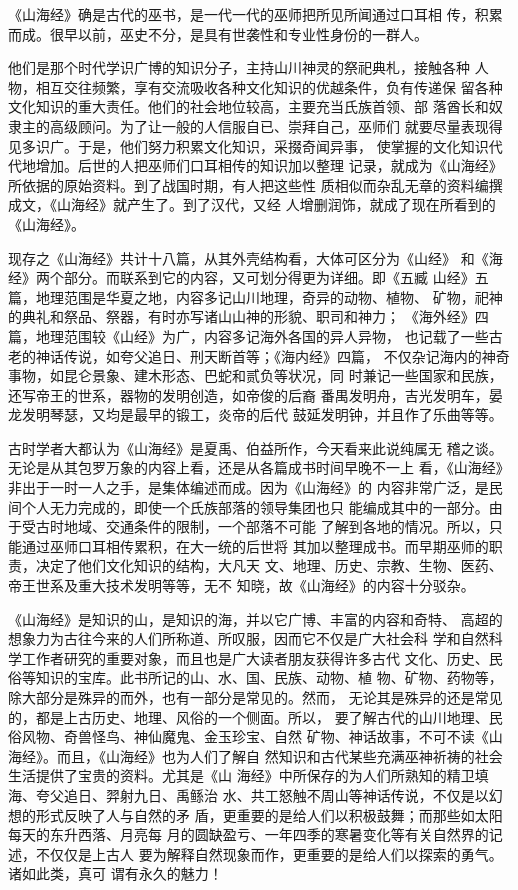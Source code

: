 \documentclass[a4paper,12pt,UTF8,twoside]{ctexbook}
\begin{document}
《山海经》确是古代的巫书，是一代一代的巫师把所见所闻通过口耳相 传，积累而成。很早以前，巫史不分，是具有世袭性和专业性身份的一群人。

他们是那个时代学识广博的知识分子，主持山川神灵的祭祀典札，接触各种 人物，相互交往频繁，享有交流吸收各种文化知识的优越条件，负有传递保 留各种文化知识的重大责任。他们的社会地位较高，主要充当氏族首领、部 落酋长和奴隶主的高级顾问。为了让一般的人信服自已、崇拜自己，巫师们 就要尽量表现得见多识广。于是，他们努力积累文化知识，采掇奇闻异事， 使掌握的文化知识代代地增加。后世的人把巫师们口耳相传的知识加以整理 记录，就成为《山海经》所依据的原始资料。到了战国时期，有人把这些性 质相似而杂乱无章的资料编撰成文，《山海经》就产生了。到了汉代，又经 人增删润饰，就成了现在所看到的《山海经》。

现存之《山海经》共计十八篇，从其外壳结构看，大体可区分为《山经》 和《海经》两个部分。而联系到它的内容，又可划分得更为详细。即《五臧 山经》五篇，地理范围是华夏之地，内容多记山川地理，奇异的动物、植物、 矿物，祀神的典礼和祭品、祭器，有时亦写诸山山神的形貌、职司和神力； 《海外经》四篇，地理范围较《山经》为广，内容多记海外各国的异人异物， 也记载了一些古老的神话传说，如夸父追日、刑天断首等；《海内经》四篇， 不仅杂记海内的神奇事物，如昆仑景象、建木形态、巴蛇和贰负等状况，同 时兼记一些国家和民族，还写帝王的世系，器物的发明创造，如帝俊的后裔 番禺发明舟，吉光发明车，晏龙发明琴瑟，又均是最早的锻工，炎帝的后代 鼓延发明钟，并且作了乐曲等等。

古时学者大都认为《山海经》是夏禹、伯益所作，今天看来此说纯属无 稽之谈。无论是从其包罗万象的内容上看，还是从各篇成书时间早晚不一上 看，《山海经》非出于一时一人之手，是集体编述而成。因为《山海经》的 内容非常广泛，是民间个人无力完成的，即使一个氏族部落的领导集团也只 能编成其中的一部分。由于受古时地域、交通条件的限制，一个部落不可能 了解到各地的情况。所以，只能通过巫师口耳相传累积，在大一统的后世将 其加以整理成书。而早期巫师的职责，决定了他们文化知识的结构，大凡天 文、地理、历史、宗教、生物、医药、帝王世系及重大技术发明等等，无不 知晓，故《山海经》的内容十分驳杂。

《山海经》是知识的山，是知识的海，并以它广博、丰富的内容和奇特、 高超的想象力为古往今来的人们所称道、所叹服，因而它不仅是广大社会科 学和自然科学工作者研究的重要对象，而且也是广大读者朋友获得许多古代 文化、历史、民俗等知识的宝库。此书所记的山、水、国、民族、动物、植 物、矿物、药物等，除大部分是殊异的而外，也有一部分是常见的。然而， 无论其是殊异的还是常见的，都是上古历史、地理、风俗的一个侧面。所以， 要了解古代的山川地理、民俗风物、奇兽怪鸟、神仙魔鬼、金玉珍宝、自然 矿物、神话故事，不可不读《山海经》。而且，《山海经》也为人们了解自 然知识和古代某些充满巫神祈祷的社会生活提供了宝贵的资料。尤其是《山 海经》中所保存的为人们所熟知的精卫填海、夸父追日、羿射九日、禹鲧治 水、共工怒触不周山等神话传说，不仅是以幻想的形式反映了人与自然的矛 盾，更重要的是给人们以积极鼓舞；而那些如太阳每天的东升西落、月亮每 月的圆缺盈亏、一年四季的寒暑变化等有关自然界的记述，不仅仅是上古人 要为解释自然现象而作，更重要的是给人们以探索的勇气。诸如此类，真可 谓有永久的魅力！
\end{document}
